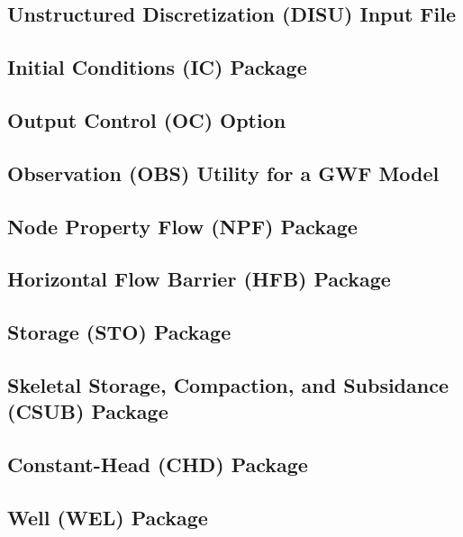 \newpage
\subsection{Unstructured Discretization (DISU) Input File}


\newpage
\subsection{Initial Conditions (IC) Package}


\newpage
\subsection{Output Control (OC) Option}


\newpage
\subsection{Observation (OBS) Utility for a GWF Model}


\newpage
\subsection{Node Property Flow (NPF) Package}


\newpage
\subsection{Horizontal Flow Barrier (HFB) Package}


\newpage
\subsection{Storage (STO) Package}


\newpage
\subsection{Skeletal Storage, Compaction, and Subsidance (CSUB) Package}


\newpage
\subsection{Constant-Head (CHD) Package}


\newpage
\subsection{Well (WEL) Package}



